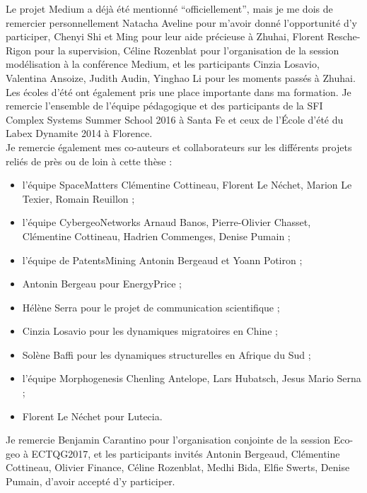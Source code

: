 Le projet Medium a déjà été mentionné ``officiellement'', mais je me dois de remercier personnellement Natacha Aveline pour m'avoir donné l'opportunité d'y participer, Chenyi Shi et Ming pour leur aide précieuse à Zhuhai, Florent Resche-Rigon pour la supervision, Céline Rozenblat pour l'organisation de la session modélisation à la conférence Medium, et les participants Cinzia Losavio, Valentina Ansoize, Judith Audin, Yinghao Li pour les moments passés à Zhuhai.\\



Les écoles d'été ont également pris une place importante dans ma formation. Je remercie l'ensemble de l'équipe pédagogique et des participants de la SFI Complex Systems Summer School 2016 à Santa Fe et ceux de l'École d'été du Labex Dynamite 2014 à Florence.\\





Je remercie également mes co-auteurs et collaborateurs sur les différents projets reliés de près ou de loin à cette thèse :
\begin{itemize}
	\item l'équipe SpaceMatters Clémentine Cottineau, Florent Le Néchet, Marion Le Texier, Romain Reuillon ;
	\item l'équipe CybergeoNetworks Arnaud Banos, Pierre-Olivier Chasset, Clémentine Cottineau, Hadrien Commenges, Denise Pumain ;
	\item l'équipe de PatentsMining Antonin Bergeaud et Yoann Potiron ;
	\item Antonin Bergeau pour EnergyPrice ;
	\item Hélène Serra pour le projet de communication scientifique ;
	\item Cinzia Losavio pour les dynamiques migratoires en Chine ;
	\item Solène Baffi pour les dynamiques structurelles en Afrique du Sud ;
	\item l'équipe Morphogenesis Chenling Antelope, Lars Hubatsch, Jesus Mario Serna ;
	\item Florent Le Néchet pour Lutecia.
\end{itemize}

Je remercie Benjamin Carantino pour l'organisation conjointe de la session Eco-geo à ECTQG2017, et les participants invités Antonin Bergeaud, Clémentine Cottineau, Olivier Finance, Céline Rozenblat, Medhi Bida, Elfie Swerts, Denise Pumain, d'avoir accepté d'y participer.

